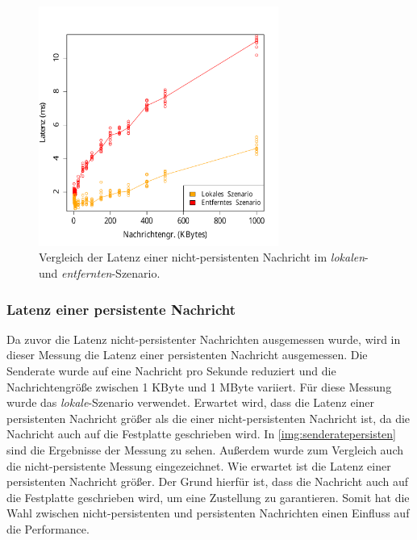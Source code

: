 \begin{figure}
\center
  \includegraphics[width=0.7\textwidth]{images/measurement/rate-limit-1-AvsB.pdf}
  \caption{Vergleich der Latenz einer nicht-persistenten Nachricht im \textit{lokalen}- und \textit{entfernten}-Szenario.}
  \label{img:senderate1-B}
\end{figure}

\subsubsection{Latenz einer persistente Nachricht}
\label{sec:persistent}
Da zuvor die Latenz nicht-persistenter Nachrichten ausgemessen wurde, wird in dieser Messung die Latenz einer persistenten Nachricht ausgemessen. Die Senderate wurde auf eine Nachricht pro Sekunde reduziert und die Nachrichtengröße zwischen 1 KByte und 1 MByte variiert. Für diese Messung wurde das \textit{lokale}-Szenario verwendet. Erwartet wird, dass die Latenz einer persistenten Nachricht größer als die einer nicht-persistenten Nachricht ist, da die Nachricht auch auf die Festplatte geschrieben wird.
In \autoref{img:senderatepersisten} sind die Ergebnisse der Messung zu sehen. Außerdem wurde zum Vergleich auch die nicht-persistente Messung eingezeichnet. Wie erwartet ist die Latenz einer persistenten Nachricht größer. Der Grund hierfür ist, dass die Nachricht auch auf die Festplatte geschrieben wird, um eine Zustellung zu garantieren. Somit hat die Wahl zwischen nicht-persistenten und persistenten Nachrichten einen Einfluss auf die Performance.

